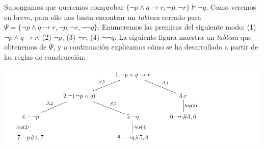 \begin{example}
Supongamos que queremos comprobar $\{\neg p \land q \rightarrow r, \neg p, \neg r\} \vDash \neg q$. Como veremos en breve, para ello nos basta encontrar un \textit{tableau} cerrado para $\Psi=\{\neg p \land q \rightarrow r, \neg p, \neg r,\neg\neg q\}$. Enumeremos las premisas del siguiente modo: (1) $\neg p \land q \rightarrow r$, (2) $\neg p$, (3) $\neg r$, (4) $\neg \neg q$. La siguiente figura muestra un \textit{tableau} que obtenemos de $\Psi$, y a continuación explicamos cómo se ha desarrollado a partir de las reglas de construcción:
\begin{center}
    
\includegraphics[scale = 0.63]{figures/tableau1.png}
\end{center}



\end{example}
